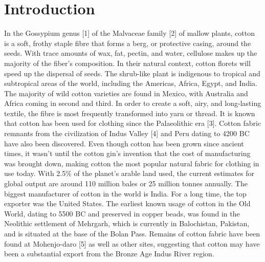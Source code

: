 \documentclass[conference]{IEEEtran}
\begin{document}
\section{Introduction}
In the Gossypium genus [1] of the Malvaceae family [2] of mallow plants, cotton is a soft, frothy staple fibre that forms a berg, or protective casing, around the seeds. With trace amounts of wax, fat, pectin, and water, cellulose makes up the majority of the fiber's composition. In their natural context, cotton florets will speed up the dispersal of seeds. The shrub-like plant is indigenous to tropical and subtropical areas of the world, including the Americas, Africa, Egypt, and India. The majority of wild cotton varieties are found in Mexico, with Australia and Africa coming in second and third. In order to create a soft, airy, and long-lasting textile, the fibre is most frequently transformed into yarn or thread. It is known that cotton has been used for clothing since the Palaeolithic era [3]. Cotton fabric remnants from the civilization of Indus Valley [4] and Peru dating to 4200 BC have also been discovered. Even though cotton has been grown since ancient times, it wasn't until the cotton gin's invention that the cost of manufacturing was brought down, making cotton the most popular natural fabric for clothing in use today. With 2.5\% of the planet's arable land used, the current estimates for global output are around 110 million bales or 25 million tonnes annually. The biggest manufacturer of cotton in the world is India. For a long time, the top exporter was the United States. The earliest known usage of cotton in the Old World, dating to 5500 BC and preserved in copper beads, was found in the Neolithic settlement of Mehrgarh, which is currently in Balochistan, Pakistan, and is situated at the base of the Bolan Pass. Remains of cotton fabric have been found at Mohenjo-daro [5] as well as other sites, suggesting that cotton may have been a substantial export from the Bronze Age Indus River region. \\
\end{document}
